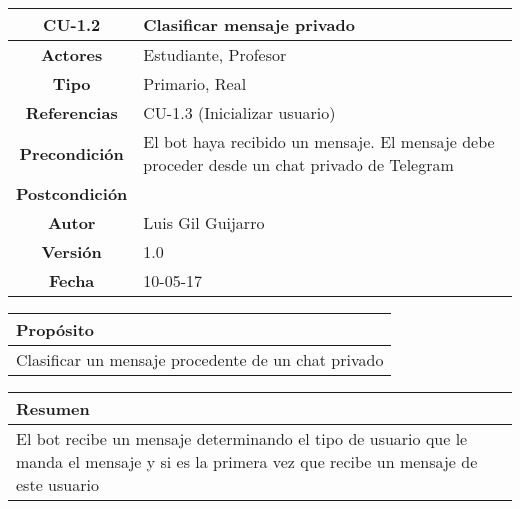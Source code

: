     
    
\begin{table}[!ht]

\begin{tabular}{|c|m{10cm}|}
\hline\rowcolor{Gray}
{\bf CU-1.2 } & { Clasificar mensaje privado}\\
\hline
{\bf Actores } & { Estudiante, Profesor} \\
\hline\rowcolor{Gray}
{\bf Tipo } & { Primario, Real} \\
\hline
{\bf Referencias }& {CU-1.3 (Inicializar usuario)} \\
\hline\rowcolor{Gray}
{\bf Precondición }& {El bot haya recibido un mensaje. El mensaje debe proceder desde un chat privado de Telegram} \\
\hline
{\bf Postcondición }& {}\\
\hline\rowcolor{Gray}
{\bf Autor }& { Luis Gil Guijarro}  \\
\hline
{\bf Versión }& { 1.0} \\
\hline\rowcolor{Gray}
{\bf Fecha }& { 10-05-17} \\
\hline
\end{tabular}

\end{table}

\begin{table}[!ht]

\begin{tabular}{|m{10cm}|}
\hline\rowcolor{Gray}
{\bf Propósito}\\
\hline
{Clasificar un mensaje procedente de un chat privado} \\
\hline

\end{tabular}


\end{table}

\begin{table}[!ht]

\begin{tabular}{|m{10cm}|}
\hline\rowcolor{Gray}
{\bf Resumen}\\
\hline
{El bot recibe un mensaje determinando el tipo de usuario que le manda el mensaje y si es la primera vez que recibe un mensaje de este usuario } \\
\hline

\end{tabular}



\end{table}

